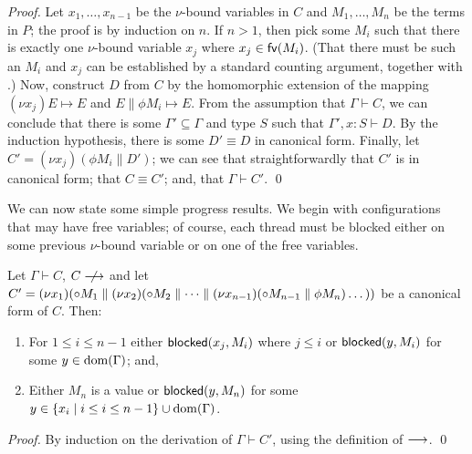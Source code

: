 \documentclass[oribibl,orivec,envcountsame]{llncs}
\begin{document}
\begin{proof}
  Let $x_1,\dots,x_{n-1}$ be the $\nu$-bound variables in $C$ and $M_1,\dots,M_n$ be the terms in
  $P$; the proof is by induction on $n$.  If $n > 1$, then pick some $M_i$ such that there is
  exactly one $\nu$-bound variable $x_j$ where $x_j \in \mathsf{fv}(M_i)$.  (That there must be such an
  $M_i$ and $x_j$ can be established by a standard counting argument, together with
  .)  Now, construct $D$ from $C$ by the homomorphic extension of
  the mapping $(\nu x_j)E \mapsto E$ and $E \parallel \phi M_i \mapsto E$.  From the assumption that
  $\Gamma \vdash C$, we can conclude that there is some $\Gamma' \subseteq \Gamma$ and type $S$ such
  that $\Gamma',x:S \vdash D$.  By the induction hypothesis, there is some $D' \equiv D$ in
  canonical form.  Finally, let $C' = (\nu x_j)(\phi M_i \parallel D')$; we can see that
  straightforwardly that $C'$ is in canonical form; that $C \equiv C'$; and, that $\Gamma \vdash
  C'$. \qed
\end{proof}

We can now state some simple progress results.  We begin with configurations that may have free
variables; of course, each thread must be blocked either on some previous $\nu$-bound variable or on
one of the free variables.
%
\begin{theorem}\label{thm:progress-open}
  Let $\Gamma \vdash C$, $C \centernot\ceval$ and let $C' = (\nu x_1)({\mathord{\circ}} M_1 \parallel (\nu
  x_2)({\mathord{\circ}} M_2 \parallel \dots \parallel (\nu x_{n-1})({\mathord{\circ}} M_{n-1} \parallel \phi M_n)\dots))$ be a
  canonical form of $C$.  Then:
  \begin{enumerate}
  \item For $1 \leq i \leq n - 1$ either $\mathsf{blocked}(x_j,M_i)$ where $j \leq i$ or $\mathsf{blocked}(y,M_i)$
    for some $y \in \operatorname{dom}(\Gamma)$; and,
  \item Either $M_n$ is a value or $\mathsf{blocked}(y,M_n)$ for some $y \in \{ x_i \mid i \leq i \leq n -
    1 \} \cup \operatorname{dom}(\Gamma)$.
  \end{enumerate}
\end{theorem}
%
\begin{proof}
  By induction on the derivation of $\Gamma \vdash C'$, using the definition of $\longrightarrow$. \qed
\end{proof}
\end{document}
